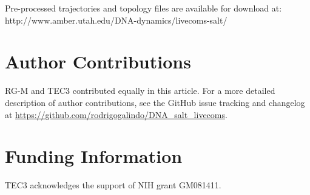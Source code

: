 \documentclass[9pt,lessons]{livecoms}
\newcommand{\githubrepository}{\url{https://github.com/rodrigogalindo/DNA_salt_livecoms}}
\begin{document}
Pre-processed trajectories and topology files are available for
download at: http://www.amber.utah.edu/DNA-dynamics/livecoms-salt/



\section{Author Contributions}
%

RG-M and TEC3 contributed equally in this article. For a more detailed description of author contributions, see the GitHub issue tracking and changelog at \githubrepository.

\section{Funding Information}
TEC3 acknowledges the support of NIH grant GM081411.




\appendix


\clearpage
\end{document}

